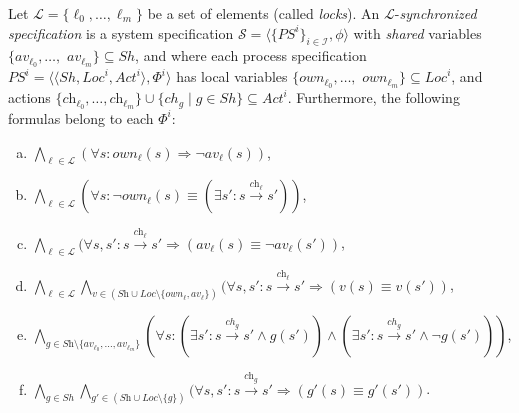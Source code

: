  \begin{definition}\label{def:system-spec}
Let $\mathcal{L} = \{\ell_0, \dots, \ell_m \}$ be a set of elements (called \emph{locks}). An $\mathcal{L}$-\emph{synchronized specification} is a system specification $\mathcal{S} = \langle \{\textit{PS}^i\}_{i \in \mathcal{I}}, \phi \rangle$ with \emph{shared} variables $\{\mathit{av}_{\ell_0}, \dots,$ $\mathit{av}_{\ell_m}\}  \subseteq \mathit{Sh}$, and where each process specification $\textit{PS}^i = \langle \langle \mathit{Sh}, \mathit{Loc}^i, \mathit{Act}^i\rangle, \Phi^i \rangle$ has local variables  $\{ \mathit{own}_{\ell_0}, \dots,$ $\mathit{own}_{\ell_m} \} \subseteq \mathit{Loc}^i$, and actions $\{\textit{ch}_{\ell_0},\dots,\textit{ch}_{\ell_m}\} \cup \{\mathit{ch}_g \mid g \in \mathit{Sh}\} \subseteq \mathit{Act}^i$. Furthermore, the following formulas belong to each $\Phi^i$:
\begin{enumerate}[(a)]%
	\item\label{system-spec-formula1}	 $\bigwedge_{\ell \in \mathcal{L}}(\forall s : \textit{own}_\ell(s) \Rightarrow   \neg \mathit{av}_\ell(s))$,
	\item\label{system-spec-formula2} $\bigwedge_{\ell \in \mathcal{L}}(\forall s  : \neg \textit{own}_\ell(s) \equiv (\exists s'  : s \overset{\textit{ch}_\ell}{\rightarrow} s'))$,
	\item\label{system-spec-formula3} $\bigwedge_{\ell \in \mathcal{L}}(\forall s,s'  : s \overset{\textit{ch}_\ell}{\rightarrow}{s'} \Rightarrow (\textit{av}_\ell(s) \equiv  \neg \textit{av}_\ell(s'))$,
	\item\label{system-spec-formula4} $\bigwedge_{\ell \in \mathcal{L}}\bigwedge_{v  \in (\textit{Sh}\cup\mathit{Loc} \setminus \{\mathit{own}_\ell, \mathit{av}_\ell\})}(\forall  s,s'  : s \overset{\textit{ch}_\ell}{\rightarrow} s' \Rightarrow (v(s) \equiv v(s'))$,
	\item\label{system-spec-formula5}   $\bigwedge_{g \in \textit{Sh}\setminus\{\mathit{av}_{\ell_0}, \dots,\mathit{av}_{\ell_m}\} }(\forall s: (\exists s': s \overset{ch_g}{\rightarrow} s' \wedge g(s')) \wedge  (\exists s': s \overset{ch_g}{\rightarrow} s' \wedge \neg g(s')))$,
	\item\label{system-spec-formula6} 	$\bigwedge_{g \in \mathit{Sh}}\bigwedge_{g'  \in (\textit{Sh}\cup\mathit{Loc} \setminus \{g\})}(\forall  s,s'  : s \overset{\textit{ch}_g}{\rightarrow} s' \Rightarrow (g'(s) \equiv g'(s'))$.
\end{enumerate}
\end{definition}
